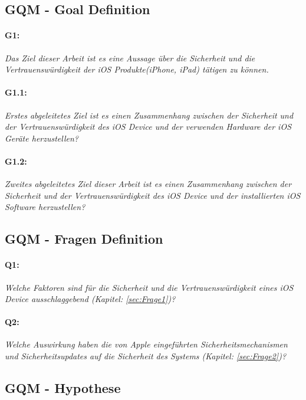 \subsection{GQM - Goal Definition}
\label{sec:GQMGoal}

\paragraph{G1:} \textit{\glqq Das Ziel dieser Arbeit ist es eine Aussage über die Sicherheit und die Vertrauenswürdigkeit der iOS Produkte(iPhone, iPad) tätigen zu können.\grqq{}}
\paragraph{G1.1:} \textit{\glqq Erstes abgeleitetes Ziel ist es einen Zusammenhang zwischen der Sicherheit und der Vertrauenswürdigkeit des iOS Device und der verwenden Hardware der iOS Geräte herzustellen?\grqq{}}

\paragraph{G1.2:} \textit{\glqq Zweites abgeleitetes Ziel dieser Arbeit ist es einen Zusammenhang zwischen der Sicherheit und der Vertrauenswürdigkeit des iOS Device und der installierten iOS Software herzustellen?\grqq{}}

\subsection{GQM - Fragen Definition}
\label{sec:GQMFragen}

\paragraph{Q1:} \textit{\glqq Welche Faktoren sind für die Sicherheit und die Vertrauenswürdigkeit eines iOS Device ausschlaggebend (Kapitel: \ref{sec:Frage1})?\grqq{}}
                    
 \paragraph{Q2:} \textit{\glqq Welche Auswirkung haben die von Apple eingeführten Sicherheitsmechanismen und Sicherheitsupdates auf die Sicherheit des Systems (Kapitel: \ref{sec:Frage2})?\grqq{}}
        
\subsection{GQM - Hypothese}
\label{sec:GQMHypothese}
